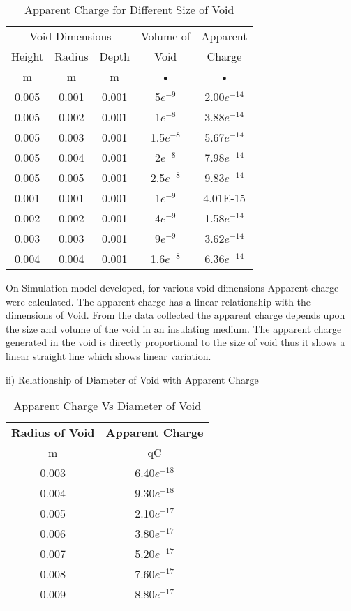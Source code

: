 \begin{table}[h!]
\caption{Apparent Charge for Different Size of Void}
\label{table:Apparent Charge for Different Size of Void}
\centering
\begin{tabular}{|c|c|c|c|c|}
\hline 
\multicolumn{3}{|c|}{Void Dimensions} & Volume of  & Apparent \\ \cline{1-3}
Height & Radius & Depth & Void & Charge \\
m & m & m & • & • \\ \hline \hline
0.005	&0.001	&0.001	&5$e^{-9}$		&2.00$e^{-14}$\\ \hline
0.005	&0.002	&0.001	&1$e^{-8}$		&3.88$e^{-14}$\\ \hline
0.005	&0.003	&0.001	&1.5$e^{-8}$	&5.67$e^{-14}$\\ \hline
0.005	&0.004	&0.001	&2$e^{-8}$		&7.98$e^{-14}$\\ \hline
0.005	&0.005	&0.001	&2.5$e^{-8}$	&9.83$e^{-14}$\\ \hline \hline
0.001	&0.001	&0.001	&1$e^{-9}$		&4.01E-15\\ \hline
0.002	&0.002	&0.001	&4$e^{-9}$		&1.58$e^{-14}$\\ \hline
0.003	&0.003	&0.001	&9$e^{-9}$		&3.62$e^{-14}$\\ \hline
0.004	&0.004	&0.001	&1.6$e^{-8}$	&6.36$e^{-14}$\\ \hline
\end{tabular} 
\end{table}

On Simulation model developed, for various void dimensions Apparent charge were calculated. The apparent charge has a linear relationship with the dimensions of Void. From the data collected the apparent charge depends upon the size and volume of the void in an insulating medium. The apparent charge generated in the void is directly proportional to the size of void thus it shows a linear straight line which shows linear variation.

ii)	Relationship of Diameter of Void with Apparent Charge

\begin{table}[h!]
\caption{Apparent Charge Vs Diameter of Void}
\label{table:Apparent Charge Vs Diameter of Void}
\centering
\begin{tabular}{|c|c|}
\hline 
\textbf{Radius of Void}	& 	\textbf{Apparent Charge}\\ 
m				&	qC	\\ \hline \hline
0.003			&	6.40$e^{-18}$\\ \hline
0.004			&	9.30$e^{-18}$\\ \hline
0.005			&	2.10$e^{-17}$\\ \hline
0.006			&	3.80$e^{-17}$\\ \hline
0.007			&	5.20$e^{-17}$\\ \hline
0.008			&	7.60$e^{-17}$\\ \hline
0.009			&	8.80$e^{-17}$\\ \hline
\end{tabular} 
\end{table}


